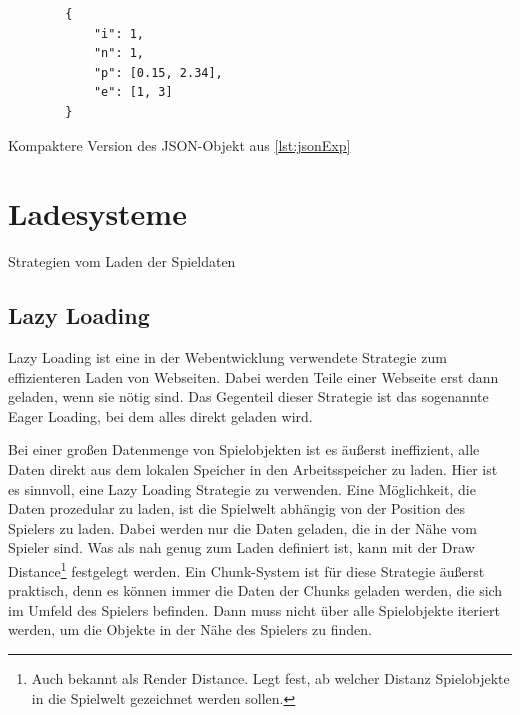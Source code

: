 \begin{listing}[htp]
    \begin{verbatim}
        {
            "i": 1,
            "n": 1,
            "p": [0.15, 2.34],
            "e": [1, 3]
        }
    \end{verbatim}
    \caption{Kompaktere Version des JSON-Objekt aus \ref{lst:jsonExp}}
    \label{lst:shorterJson}
\end{listing}




\section{Ladesysteme}\label{sect:ladesysteme}
Strategien vom Laden der Spieldaten


\subsection{Lazy Loading} \label{ssect:lazyloading}
Lazy Loading ist eine in der Webentwicklung verwendete Strategie zum effizienteren Laden von Webseiten. Dabei werden Teile einer Webseite erst dann geladen, wenn sie nötig sind. Das Gegenteil dieser Strategie ist das sogenannte Eager Loading, bei dem alles direkt geladen wird.\cite{cloudflareLazyLoad}

Bei einer großen Datenmenge von Spielobjekten ist es äußerst ineffizient, alle Daten direkt aus dem lokalen Speicher in den Arbeitsspeicher zu laden. Hier ist es sinnvoll, eine Lazy Loading Strategie zu verwenden. Eine Möglichkeit, die Daten prozedular zu laden, ist die Spielwelt abhängig von der Position des Spielers zu laden. Dabei werden nur die Daten geladen, die in der Nähe vom Spieler sind. Was als nah genug zum Laden definiert ist, kann mit der Draw Distance\footnote{Auch bekannt als Render Distance. Legt fest, ab welcher Distanz Spielobjekte in die Spielwelt gezeichnet werden sollen.\cite{nerdburglarsWhatDraw}} festgelegt werden. Ein Chunk-System ist für diese Strategie äußerst praktisch, denn es können immer die Daten der Chunks geladen werden, die sich im Umfeld des Spielers befinden. Dann muss nicht über alle Spielobjekte iteriert werden, um die Objekte in der Nähe des Spielers zu finden.




